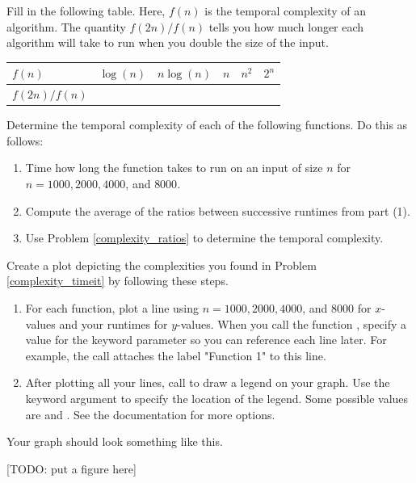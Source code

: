 \begin{problem}\label{complexity_ratios}
Fill in the following table. Here, $f(n)$ is the temporal complexity of an algorithm. The quantity $f(2n)/f(n)$ tells you how much longer each algorithm will take to run when you double the size of the input.

\begin{center}
\begin{tabular}{| l |p{15mm}|p{15mm}|p{15mm}|p{15mm}|p{15mm}|}\hline
$f(n)$ & $\log(n)$ & $n\log(n)$ & $n$ & $n^2$ & $2^n$ \\ \hline
$f(2n)/f(n)$&  & & & & \\
\hline
\end{tabular}
\end{center}

\end{problem}

\begin{problem}\label{complexity_timeit}
Determine the temporal complexity of each of the following functions. Do this as follows:
\begin{enumerate}
\item Time how long the function takes to run on an input of size $n$ for $n=1000, 2000, 4000$, and $8000$.
\item Compute the average of the ratios between successive runtimes from part (1).
\item Use Problem \ref{complexity_ratios} to determine the temporal complexity.
\end{enumerate}
\end{problem}

\begin{problem}
Create a plot depicting the complexities you found in Problem \ref{complexity_timeit} by following these steps. 
\begin{enumerate}
\item For each function, plot a line using $n=1000, 2000, 4000$, and $8000$ for $x$-values and your runtimes for $y$-values. When you call the function , specify a value for the keyword parameter  so you can reference each line later. For example, the call  attaches the label "Function 1" to this line.
\item After plotting all your lines, call  to draw a legend on your graph. Use the keyword argument  to specify the location of the legend. Some possible values are  and . See the documentation for more options.
\end{enumerate}
Your graph should look something like this.

[TODO: put a figure here]
\end{problem}



